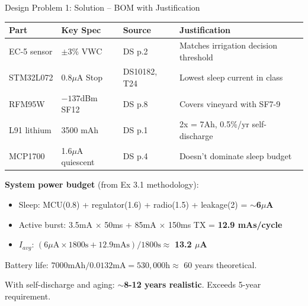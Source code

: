 \documentclass[aspectratio=169,11pt]{beamer}
\begin{document}
\begin{frame}{Design Problem 1: Solution -- BOM with Justification}
    \footnotesize
    \begin{center}
    \begin{tabular}{llll}
        \toprule
        \textbf{Part} & \textbf{Key Spec} & \textbf{Source} & \textbf{Justification} \\
        \midrule
        EC-5 sensor & $\pm$3\% VWC & DS p.2 & Matches irrigation decision threshold \\
        STM32L072 & 0.8$\mu$A Stop & DS10182, T24 & Lowest sleep current in class \\
        RFM95W & $-137$dBm SF12 & DS p.8 & Covers vineyard with SF7-9 \\
        L91 lithium & 3500 mAh & DS p.1 & 2x = 7Ah, 0.5\%/yr self-discharge \\
        MCP1700 & 1.6$\mu$A quiescent & DS p.4 & Doesn't dominate sleep budget \\
        \bottomrule
    \end{tabular}
    \end{center}
    \normalsize
    
    \vspace{0.2cm}
    \textbf{System power budget} (from Ex 3.1 methodology):
    \begin{itemize}
        \item Sleep: MCU(0.8) + regulator(1.6) + radio(1.5) + leakage(2) = \textbf{$\sim$6$\mu$A}
        \item Active burst: 3.5mA $\times$ 50ms + 85mA $\times$ 150ms TX = \textbf{12.9 mAs/cycle}
        \item $I_{avg}$: $(6\mu\text{A} \times 1800\text{s} + 12.9\text{mAs}) / 1800\text{s} \approx$ \textbf{13.2 $\mu$A}
    \end{itemize}
    
    Battery life: $7000\text{mAh} / 0.0132\text{mA} = 530,000\text{h} \approx$ 60 years theoretical.
    
    With self-discharge and aging: \textbf{$\sim$8-12 years realistic}. Exceeds 5-year requirement.
\end{frame}
\end{document}
